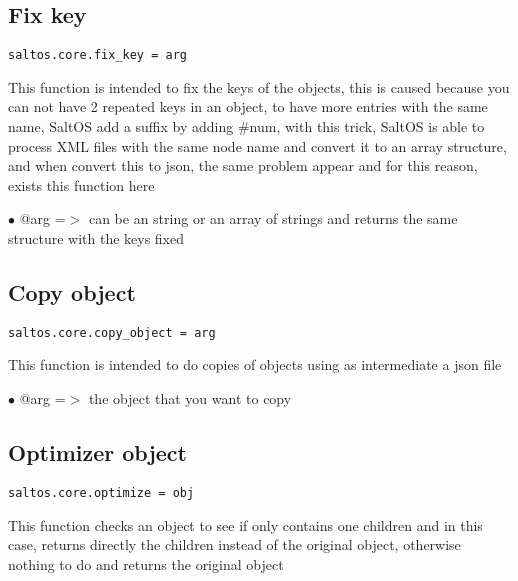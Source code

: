 \documentclass[a4paper]{book}
\begin{document}
\hypertarget{toc518}{}
\subsection{Fix key}

\begin{lstlisting}
saltos.core.fix_key = arg
\end{lstlisting}

This function is intended to fix the keys of the objects, this is caused because you can not
have 2 repeated keys in an object, to have more entries with the same name, SaltOS add a suffix
by adding \#num, with this trick, SaltOS is able to process XML files with the same node name
and convert it to an array structure, and when convert this to json, the same problem appear and
for this reason, exists this function here

\begin{compactitem}
\item[\color{myblue}$\bullet$] @arg =$>$ can be an string or an array of strings and returns the same structure with the keys fixed
\end{compactitem}

\hypertarget{toc519}{}
\subsection{Copy object}

\begin{lstlisting}
saltos.core.copy_object = arg
\end{lstlisting}

This function is intended to do copies of objects using as intermediate a json file

\begin{compactitem}
\item[\color{myblue}$\bullet$] @arg =$>$ the object that you want to copy
\end{compactitem}

\hypertarget{toc520}{}
\subsection{Optimizer object}

\begin{lstlisting}
saltos.core.optimize = obj
\end{lstlisting}

This function checks an object to see if only contains one children and in this case, returns
directly the children instead of the original object, otherwise nothing to do and returns the
original object
\end{document}
